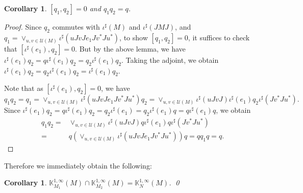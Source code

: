 \documentclass[a4paper, 11pt, reqno]{amsart}
\numberwithin{equation}{section}
\theoremstyle{plain}
\newtheorem{corollary}[thm]{Corollary}
\theoremstyle{remark}
\theoremstyle{definition}
\newcommand{\KKK}{{\mathbb K}}
\begin{document}
\begin{corollary}
    $ [q_1,q_2]=0$ and $q_1q_2=q$.
\end{corollary}
\begin{proof}
    Since $q_2$ commutes with $\iota^{\sharp}(M)$ and $\iota^{\sharp}(JMJ)$, and $q_1 = \vee_{u,v\in \mathcal{U}(M)} \iota^{\sharp}(uJvJe_1Jv^*Ju^*)$, to show $[q_1,q_2] = 0$, it suffices to check that $ [\iota^{\sharp}(e_1),q_2] = 0 $. But by the above lemma, we have $ \iota^{\sharp}(e_1)q_2 = q\iota^{\sharp}(e_1)q_2 = q_2\iota^{\sharp}(e_1)q_2 $. Taking the adjoint, we obtain $ \iota^{\sharp}(e_1)q_2=q_2\iota^{\sharp}(e_1)q_2=  \iota^{\sharp}(e_1)q_2 $.

    Note that as $ [\iota^{\sharp}(e_1),q_2] =0$, we have
    $$ q_1q_2 = q_1 = \vee_{u,v\in \mathcal{U}(M)} \iota^{\sharp}(uJvJe_1Jv^*Ju^*)q_2 = \vee_{u,v\in \mathcal{U}(M)} \iota^{\sharp}(uJvJ) \iota^{\sharp}(e_1)q_2\iota^{\sharp}(Jv^*Ju^*). $$
    Since $ \iota^{\sharp}(e_1)q_2 = q\iota^{\sharp}(e_1)q_2 = q_2\iota^{\sharp}(e_1) = q_2\iota^{\sharp}(e_1)q= q\iota^{\sharp}(e_1)q $, we obtain
    \begin{align*}
        q_1q_2 =& \vee_{u,v\in \mathcal{U}(M)} \iota^{\sharp}(uJvJ) q\iota^{\sharp}(e_1)q\iota^{\sharp}(Jv^*Ju^*)\\ =& q\left( \vee_{u,v\in \mathcal{U}(M)} \iota^{\sharp}(uJvJe_1Jv^*Ju^*) \right)q = qq_1q=q.
    \end{align*} 
\end{proof}


Therefore we immediately obtain the following:

\begin{corollary}\label{corollary for support projections}
    $ \KKK^{1,\infty}_{M_1}(M)\cap \KKK^{1,\infty}_{M_2}(M) = \KKK^{1,\infty}_{N}(M)$. \qed 
\end{corollary}
\end{document}
